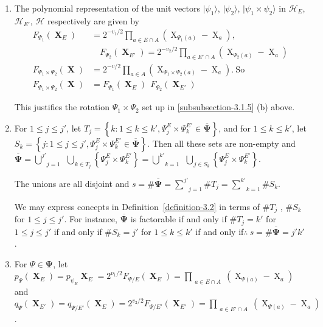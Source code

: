 \documentclass[a4paper,12pt]{article}
\DeclareMathOperator{\x}{\mathrm{X}}
\theoremstyle{definition}
\theoremstyle{underlinethm}
\theoremstyle{definition}
\begin{document}
\begin{enumerate}[label=(\alph*)]

\item The polynomial representation of the unit vectors $| \psi_{1} \rangle$, $| \psi_{2} \rangle$, $| \psi_{1} \times \psi_{2} \rangle$  in $\mathcal{H}_{E}$, $\mathcal{H}_{E'}$, $\mathcal{H}$ respectively are given by 
\begin{align*}
F_{\Psi_{1}} (\boldsymbol{\x}_{E}) & =  2^{-v_{1}/2} \prod_{a\in E \cap A}(\x_{\Psi_{1}(a)}- \x_{a}),~~\\
 &\quad F_{\Psi_{2}} (\boldsymbol{\x}_{E'})= 2^{-v_{2}/2} \prod_{a \in E' \cap A}(\x_{\Psi_{2}(a)}-\x_{a})\\
F_{\Psi_{1} \times \Psi_{2}} (\boldsymbol{\x}) &= 2^{-v/2} \prod_{a \in A} (\x_{\Psi_{1} \times \Psi_{2}(a)} - \x_{a}).~\text{So}\\
F_{\Psi_{1} \times \Psi_{2}} (\boldsymbol{\x}) &= F_{\Psi_{1}} (\boldsymbol{\x}_{E})~~ F_{\Psi_{2}}(\boldsymbol{\x}_{E'})\tag{3.21}
\end{align*}

This justifies the rotation $\Psi_{1} \times \Psi_{2}$ set up in \eqref{subsubsection-3.1.5} (b) above.

\item For $1 \leq j \leq j'$, let $T_{j} = \left\{k : 1 \leq k \leq k', \Psi_{j}^{E} \times \Psi_{k}^{E'} \in \overline{\boldsymbol{\Psi}}\right\}$, and for $1 \leq k \leq k'$, let $S_{k} = \left\{j : 1 \leq j \leq j', \Psi_{j}^{E} \times \Psi_{k}^{E'} \in  \overline{\boldsymbol{\Psi}}\right\}$. Then all these sets are non-empty  and $\overline{\boldsymbol{\Psi}} = \underset{j=1}{\overset{j'}{\bigcup}} ~~ \underset{k \in T_{j}}{\overset{}\bigcup} \left\{\Psi_{j}^{E} \times \Psi_{k}^{E'}\right\} = \underset{k=1}{\overset{k'}{\bigcup}}~~ \underset{j\in S_{k}}{\overset{}{\bigcup}}\left\{\Psi_{j}^{E} \times \Psi_{k}^{E'} \right\}$.

The unions are all disjoint and $s = \# \overline{\boldsymbol{\Psi}} = \underset{j=1}{\overset{j'}{\sum}} \# T_{j} = \underset{k=1}{\overset{k'}{\sum}} \# S_{k}$.

We may express concepts in Definition~\eqref{definition-3.2} in terms of $\# T_{j}$ , $\# S_{k}$ for $1 \leq j \leq j'$. For instance, $\overline{\boldsymbol{\Psi}}$ is factorable if and only if $\# T_{j} = k'$ for $1 \leq j \leq j'$ if and only if $\# S_{k} = j'$ for $1 \leq k \leq k'$ if and only if$\therefore~ s = \# \overline{\boldsymbol{\Psi}} = j' k'$.  

\item For $\Psi \in {\boldsymbol{\Psi}}$, let $p_{\Psi} ({\boldsymbol{\x}}_{E}) = p_{\psi_{E}}{\boldsymbol{\x}_{E}}= 2^{\nu_{1}/2}F_{\Psi/E}({\boldsymbol{\x}}_{E})= \prod\limits_{\substack{a\in E \cap A}}(\x_{\Psi(a)}- \x_{a})$ and $q_{\Psi}({\boldsymbol{\x}}_{E'}) = q_{\Psi/E'}(\boldsymbol{\x}_{E}) = 2^{v_{2}/2} F_{\Psi/E'} ({\boldsymbol{\x}}_{E'}) = \prod\limits_{\substack{a \in E' \cap A}} (\x_{\Psi(a)} - \x_{a})$.


\end{enumerate}
\end{document}
